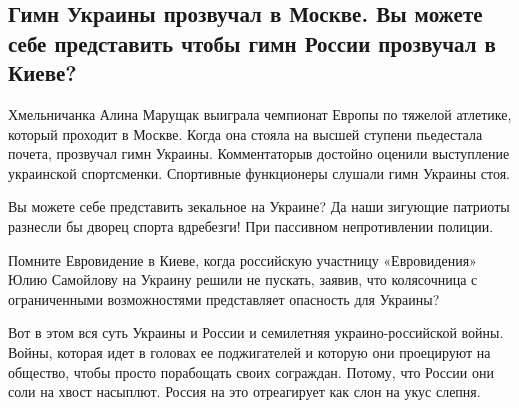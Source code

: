  
 
 
 
 

\subsection{Гимн Украины прозвучал в Москве. Вы можете себе представить чтобы гимн России прозвучал в Киеве?}

Хмельничанка Алина Марущак выиграла чемпионат Европы по тяжелой атлетике,
который проходит в Москве. Когда она стояла на высшей ступени пьедестала
почета, прозвучал гимн Украины. Комментаторыв достойно оценили выступление
украинской спортсменки. Спортивные функционеры слушали гимн Украины стоя.

Вы можете себе представить зекальное на Украине?  Да наши зигующие патриоты
разнесли бы дворец спорта вдребезги!  При пассивном непротивлении полиции.

Помните Евровидение в Киеве, когда российскую участницу «Евровидения» Юлию
Самойлову на Украину решили не пускать, заявив, что колясочница с ограниченными
возможностями  представляет опасность для Украины?

Вот в этом вся суть Украины и России  и семилетняя украино-российской войны.
Войны, которая идет в головах ее поджигателей и которую они проецируют на
общество, чтобы просто порабощать своих сограждан. Потому, что России они соли
на хвост насыплют.  Россия на это отреагирует как слон на укус слепня.
